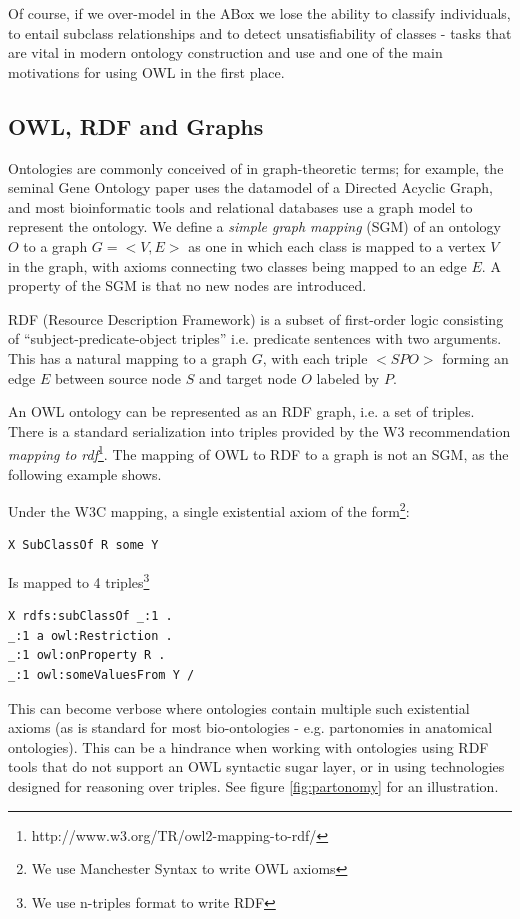 \documentclass{my}
\begin{document}
Of course, if we over-model in the ABox we lose the ability to
classify individuals, to entail subclass relationships and to detect
unsatisfiability of classes - tasks that are vital in modern ontology
construction and use and one of the main motivations for using OWL in
the first place.

\subsection{OWL, RDF and Graphs}

Ontologies are commonly conceived of in graph-theoretic terms; for
example, the seminal Gene Ontology paper\cite{Ashburner2000} uses the
datamodel of a Directed Acyclic Graph, and most bioinformatic tools
and relational databases use a graph model to represent the
ontology\cite{Mungall2007}. We define a \emph{simple graph mapping} (SGM) of
an ontology $O$ to a graph $G = <V,E>$ as one in which each class is
mapped to a vertex $V$ in the graph, with axioms connecting two
classes being mapped to an edge $E$. A property of the SGM is that no
new nodes are introduced.

RDF (Resource Description Framework) is a subset of first-order logic
consisting of ``subject-predicate-object triples'' i.e. predicate
sentences with two arguments. This has a natural mapping to a graph
$G$, with each triple $<S P O>$ forming an edge $E$ between source
node $S$ and target node $O$ labeled by $P$.

An OWL ontology can be represented as an RDF graph, i.e. a set of
triples. There is a standard serialization into triples provided by
the W3 recommendation \emph{mapping to
  rdf}\footnote{http://www.w3.org/TR/owl2-mapping-to-rdf/}. The
mapping of OWL to RDF to a graph is not an SGM, as the following
example shows.

Under the W3C mapping, a single existential axiom of the
form\footnote{We use Manchester Syntax to write OWL axioms}:

\begin{verbatim}
X SubClassOf R some Y
\end{verbatim}

Is mapped to 4 triples\footnote{We use n-triples format to write RDF}

\begin{verbatim}
X rdfs:subClassOf _:1 .
_:1 a owl:Restriction .
_:1 owl:onProperty R .
_:1 owl:someValuesFrom Y /
\end{verbatim}

This can become verbose where ontologies contain multiple such
existential axioms (as is standard for most bio-ontologies -
e.g. partonomies in anatomical ontologies). This can be a hindrance
when working with ontologies using RDF tools that do not support an
OWL syntactic sugar layer, or in using technologies designed for
reasoning over triples. See figure \ref{fig:partonomy} for an illustration.
\end{document}
